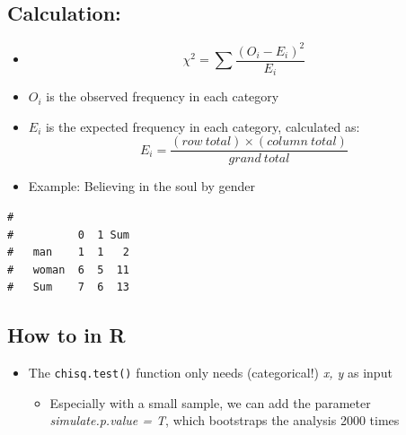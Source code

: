 \documentclass[
]{book}
\newenvironment{Shaded}{\begin{snugshade}}{\end{snugshade}}
\newcommand{\AttributeTok}[1]{\textcolor[rgb]{0.13,0.29,0.53}{#1}}
\newcommand{\CommentTok}[1]{\textcolor[rgb]{0.56,0.35,0.01}{\textit{#1}}}
\newcommand{\FunctionTok}[1]{\textcolor[rgb]{0.13,0.29,0.53}{\textbf{#1}}}
\newcommand{\NormalTok}[1]{#1}
\newcommand{\SpecialCharTok}[1]{\textcolor[rgb]{0.81,0.36,0.00}{\textbf{#1}}}
\providecommand{\tightlist}{%
  \setlength{\itemsep}{0pt}\setlength{\parskip}{0pt}}
\begin{document}
\subsection{Calculation:}\label{calculation}

\begin{itemize}
\item
  \[\chi^2 = \sum \frac{(O_i - E_i)^2}{E_i}\]
\item
  \(O_i\) is the observed frequency in each category
\item
  \(E_i\) is the expected frequency in each category, calculated as: \[E_i = \frac{(row \ total) \times (column \ total)}{grand \ total}\]
\item
  Example: Believing in the soul by gender
\end{itemize}

\begin{verbatim}
#        
#          0  1 Sum
#   man    1  1   2
#   woman  6  5  11
#   Sum    7  6  13
\end{verbatim}

\subsection{How to in R}\label{how-to-in-r}

\begin{itemize}
\tightlist
\item
  The \texttt{chisq.test()} function only needs (categorical!) \emph{x, y} as input

  \begin{itemize}
  \tightlist
  \item
    Especially with a small sample, we can add the parameter \emph{simulate.p.value = T}, which bootstraps the analysis 2000 times
  \end{itemize}
\end{itemize}

\begin{Shaded}
\end{Shaded}
\end{document}
